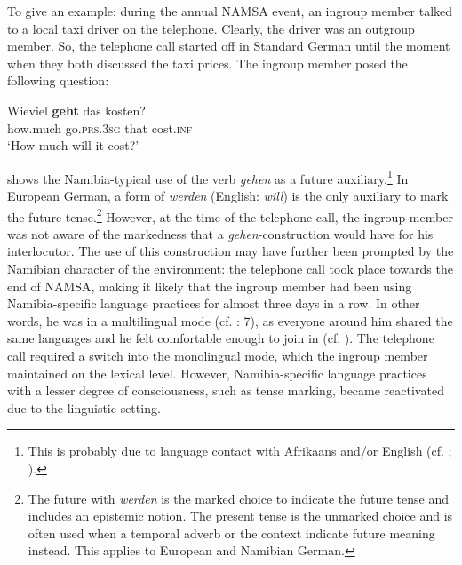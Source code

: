 \documentclass[output=paper]{langsci/langscibook}
\begin{document}
To give an example: during the annual NAMSA event, an ingroup member talked to a local taxi driver on the telephone. Clearly, the driver was an outgroup member. So, the telephone call started off in Standard German until the moment when they both discussed the taxi prices. The ingroup member posed the following question:\largerpage

\ea
\label{ex:radke:3}
 	\gll Wieviel \textbf{geht} das kosten? \\
		{how.much}  go.\textsc{prs.3sg}   that  cost\textsc{.inf}\\
     \glt `How much will it cost?'\\
 \z
 
 shows the Namibia-typical use of the verb \textit{gehen} as a future auxiliary.\footnote{This is probably due to language contact with Afrikaans and/or English (cf. \citealt[33]{shah_german_2007}; \citealt[234--235]{radke_hat_2019b}).} In European German, a form of \textit{werden} (English: \textit{will}) is the only auxiliary to mark the future tense.\footnote{The future with \textit{werden} is the marked choice to indicate the future tense and includes an epistemic notion. The present tense is the unmarked choice and is often used when a temporal adverb or the context indicate future meaning instead. This applies to European and Namibian German.} However, at the time of the telephone call, the ingroup member was not aware of the markedness that a \textit{gehen}-construction would have for his interlocutor. The use of this construction may have further been prompted by the Namibian character of the environment: the telephone call took place towards the end of NAMSA, making it likely that the ingroup member had been using Namibia-specific language practices for almost three days in a row. In other words, he was in a multilingual mode (cf. \citealt{hoder_mehrsprachige_2018}: 7), as everyone around him shared the same languages and he felt comfortable enough to join in (cf. \citealt[2]{grosjean_bilingual_2012}). The telephone call required a switch into the monolingual mode, which the ingroup member maintained on the lexical level. However, Namibia-specific language practices with a lesser degree of consciousness, such as tense marking, became reactivated due to the linguistic setting.
\end{document}
